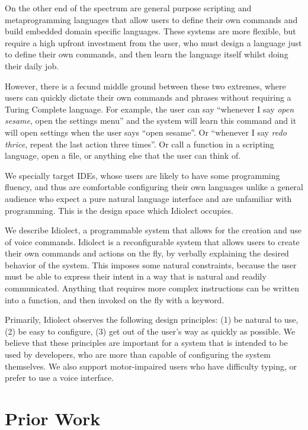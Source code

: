 \documentclass[conference]{IEEEtran}
\begin{document}
On the other end of the spectrum are general purpose scripting and metaprogramming languages that allow users to define their own commands and build embedded domain specific languages. These systems are more flexible, but require a high upfront investment from the user, who must design a language just to define their own commands, and then learn the language itself whilst doing their daily job.

However, there is a fecund middle ground between these two extremes, where users can quickly dictate their own commands and phrases without requiring a Turing Complete language. For example, the user can say ``whenever I say \textit{open sesame}, open the settings menu'' and the system will learn this command and it will open settings when the user says ``open sesame''. Or ``whenever I say \textit{redo thrice}, repeat the last action three times''. Or call a function in a scripting language, open a file, or anything else that the user can think of.

We specially target IDEs, whose users are likely to have some programming fluency, and thus are comfortable configuring their own languages unlike a general audience who expect a pure natural language interface and are unfamiliar with programming. This is the design space which Idiolect occupies.

We describe Idiolect, a programmable system that allows for the creation and use of voice commands. Idiolect is a reconfigurable system that allows users to create their own commands and actions on the fly, by verbally explaining the desired behavior of the system. This imposes some natural constraints, because the user must be able to express their intent in a way that is natural and readily communicated. Anything that requires more complex instructions can be written into a function, and then invoked on the fly with a keyword.

Primarily, Idiolect observes the following design principles: (1) be natural to use, (2) be easy to configure, (3) get out of the user's way as quickly as possible. We believe that these principles are important for a system that is intended to be used by developers, who are more than capable of configuring the system themselves. We also support motor-impaired users who have difficulty typing, or prefer to use a voice interface.

\section{Prior Work}
\end{document}
